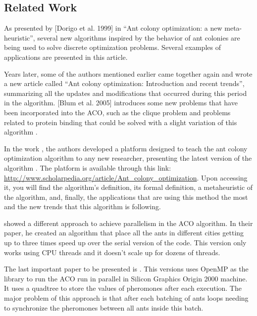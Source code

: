 \subsection{Related Work}


As presented by [Dorigo et al. 1999] in ``Ant colony optimization: a new meta-heuristic'', several
new algorithms inspired by the behavior of ant colonies are being used
to solve discrete optimization problems. Several
examples of applications are presented in this article.

Years later, some of the authors mentioned earlier came together again and
wrote a new article called ``Ant colony optimization: Introduction and recent trends'', summarizing all the updates
and modifications that occurred during this period in the algorithm. [Blum et al. 2005] introduces
some new problems that have been incorporated into the ACO, such as the clique problem and problems
related to protein binding that could be solved with a slight variation of this algorithm
\cite{UpdatesInACO}.

In the work \cite{ACONewAlgorithm20anos}, the authors
developed a platform designed to teach the ant colony optimization algorithm
to any new researcher, presenting the latest version of the algorithm \cite{ACONewAlgorithm20anos}.
The platform is available through this link: \url{http://www.scholarpedia.org/article/Ant_colony_optimization}.
Upon accessing it, you will find the algorithm's definition, its formal definition, a metaheuristic
of the algorithm, and, finally, the applications that are using this method the most and the new trends
that this algorithm is following.

\cite{paralellAco} showed a different approach to achieve parallelism in the ACO algorithm.
In their paper, he created an algorithm that place all the ants in different
cities getting up to three times speed up over the serial version of the code. This version only works
using CPU threads and it doesn't scale up for dozens of threads.

The last important paper to be presented is \cite{openmpAco}. This versions uses OpenMP as the library
to run the ACO run in parallel in Silicon Graphics Origin 2000 machine.
It uses a quadtree to store the values of pheromones after each execution. The major problem of
this approach is that after each batching of ants loops needing to synchronize the pheromones between all
ants inside this batch.
